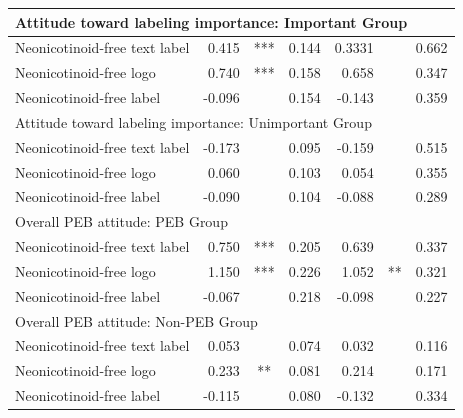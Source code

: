 \documentclass{article}
\begin{document}
\begin{center}
\begin{tabular}{l r c r r c r}
\multicolumn{7}{l}{Attitude toward labeling importance: Important Group} \\
\hline
Neonicotinoid-free text label & 0.415 & *** & 0.144 & 0.3331 & & 0.662\\
Neonicotinoid-free logo       & 0.740 & *** & 0.158 & 0.658 & & 0.347\\
Neonicotinoid-free label      & -0.096 & & 0.154 & -0.143 & & 0.359\\
\hline

\multicolumn{7}{l}{Attitude toward labeling importance: Unimportant Group} \\
\hline
Neonicotinoid-free text label& -0.173 & & 0.095 & -0.159 & & 0.515\\
Neonicotinoid-free logo       & 0.060 & & 0.103 & 0.054 & & 0.355\\
Neonicotinoid-free label      & -0.090 & & 0.104 & -0.088 & & 0.289\\
\hline

\multicolumn{7}{l}{Overall PEB attitude: PEB Group} \\
\hline
Neonicotinoid-free text label & 0.750 & *** & 0.205 & 0.639 & & 0.337\\
Neonicotinoid-free logo       & 1.150 & *** & 0.226 & 1.052 & ** & 0.321\\
Neonicotinoid-free label      & -0.067 & & 0.218 & -0.098 & & 0.227\\
\hline

\multicolumn{7}{l}{Overall PEB attitude: Non-PEB Group} \\
\hline
Neonicotinoid-free text label & 0.053 & & 0.074 & 0.032 & & 0.116\\
Neonicotinoid-free logo       & 0.233& **& 0.081& 0.214 & & 0.171\\
Neonicotinoid-free label      & -0.115 & & 0.080& -0.132 & & 0.334\\
\hline
\end{tabular}
\end{center}
\end{document}
